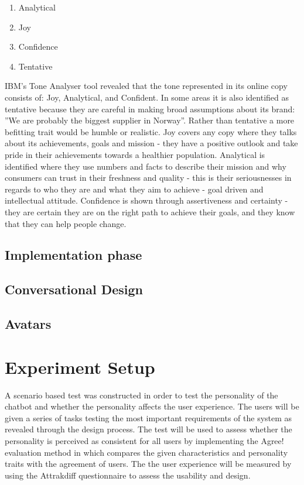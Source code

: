         \begin{enumerate}
            \item Analytical
            \item Joy
            \item Confidence
            \item Tentative
        \end{enumerate}

        IBM’s Tone Analyser tool revealed that the tone represented in its online copy consists of: Joy, Analytical, and Confident. In some areas it is also identified as tentative because they are careful in making broad assumptions about its brand: ”We are probably the biggest supplier in Norway”. Rather than tentative a more befitting trait would be humble or realistic. Joy covers any copy where they talks about its achievements, goals and mission - they have a positive outlook and take pride in their achievements towards a healthier population. Analytical is identified where they use numbers and facts to describe their mission and why consumers can trust in their freshness and quality - this is their seriousnesses in regards to who they are and what they aim to achieve - goal driven and intellectual attitude. Confidence is shown through assertiveness and certainty - they are certain they are on the right path to achieve their goals, and they know that they can help people change. 


    \subsection{Implementation phase}
        \subsection{Conversational Design}
        \subsection{Avatars}
    
    \vspace{5mm} %
    
    \section{Experiment Setup}
    
    A scenario based test was constructed in order to test the personality of the chatbot and whether the personality affects the user experience. The users will be given a series of tasks testing the most important requirements of the system as revealed through the design process. The test will be used to assess whether the personality is perceived as consistent for all users by implementing the Agree! evaluation method in which compares the given characteristics and personality traits with the agreement of users. The the user experience will be measured by using the Attrakdiff questionnaire to assess the usability and design. 
    

